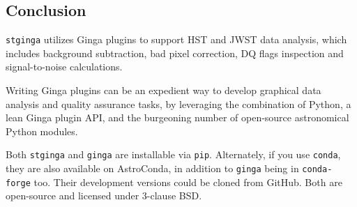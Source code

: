 \documentclass[]{article}
\begin{document}
\begin{multicols}{3}
\section*{Conclusion}

{\tt stginga} utilizes Ginga plugins to support HST and JWST data analysis,
which includes background subtraction, bad pixel correction, DQ flags
inspection and signal-to-noise calculations.

\para
Writing Ginga plugins can be an expedient way to develop graphical data
analysis and quality assurance tasks, by leveraging the combination of
Python, a lean Ginga plugin API, and the burgeoning number of open-source
astronomical Python modules.

\para
Both {\tt stginga} and {\tt ginga} are installable via {\tt pip}. Alternately,
if you use {\tt conda}, they are also available on AstroConda\cite{astroconda},
in addition to {\tt ginga} being in  {\tt conda-forge} too. Their development
versions could be cloned from GitHub. Both are open-source and licensed under
3-clause BSD.




\end{multicols}
\end{document}

